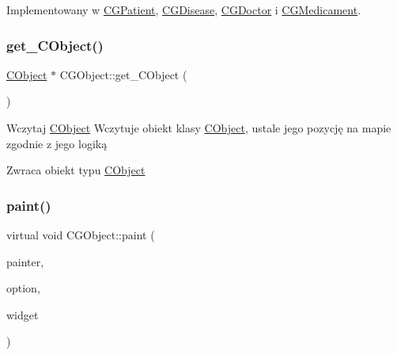 Implementowany w \mbox{\hyperlink{class_c_g_patient_ae0150504523660b474078c309e2a8d3f}{C\+G\+Patient}}, \mbox{\hyperlink{class_c_g_disease_ab2652078d767e244b586577cbda52beb}{C\+G\+Disease}}, \mbox{\hyperlink{class_c_g_doctor_a54058ba434d8d7d0c6bf16c1a9f6536a}{C\+G\+Doctor}} i \mbox{\hyperlink{class_c_g_medicament_aa64c33d0aced10421c734961cfdd8344}{C\+G\+Medicament}}.

\mbox{\label{class_c_g_object_a711377d1f415ee8f9944fbad886e0ce4}} 
\subsubsection{\texorpdfstring{get\+\_\+\+C\+Object()}{get\_CObject()}}
{\footnotesize\ttfamily \mbox{\hyperlink{class_c_object}{C\+Object}} $\ast$ C\+G\+Object\+::get\+\_\+\+C\+Object (\begin{DoxyParamCaption}{ }\end{DoxyParamCaption})}



Wczytaj \mbox{\hyperlink{class_c_object}{C\+Object}} Wczytuje obiekt klasy \mbox{\hyperlink{class_c_object}{C\+Object}}, ustale jego pozycję na mapie zgodnie z jego logiką 

\begin{DoxyReturn}{Zwraca}
obiekt typu \mbox{\hyperlink{class_c_object}{C\+Object}} 
\end{DoxyReturn}
\mbox{\label{class_c_g_object_a9622c313eb09ca5fc0e34f5d2aaac910}} 
\subsubsection{\texorpdfstring{paint()}{paint()}}
{\footnotesize\ttfamily virtual void C\+G\+Object\+::paint (\begin{DoxyParamCaption}\item[{Q\+Painter $\ast$}]{painter,  }\item[{const Q\+Style\+Option\+Graphics\+Item $\ast$}]{option,  }\item[{Q\+Widget $\ast$}]{widget }\end{DoxyParamCaption})\hspace{0.3cm}{\ttfamily [pure virtual]}}



